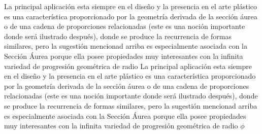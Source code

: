 La principal aplicación esta siempre en el diseño y la presencia en el arte plástico es una característica proporcionado por la geometría derivada de la sección áurea o de una cadena de proporciones relacionadas (este es una noción importante donde será ilustrado después), donde se produce la recurrencia de formas similares, pero la sugestión mencionad arriba es especialmente asociada con la Sección Áurea porque ella posee propiedades muy interesantes con la infinita variedad de progresión geométrica de radio
La principal aplicación esta siempre en el diseño y la presencia en el arte plástico es una característica proporcionado por la geometría derivada de la sección áurea o de una cadena de proporciones relacionadas (este es una noción importante donde será ilustrado después), donde se produce la recurrencia de formas similares, pero la sugestión mencionad arriba es especialmente asociada con la Sección Áurea porque ella posee propiedades muy interesantes con la infinita variedad de progresión geométrica de radio $\phi$


